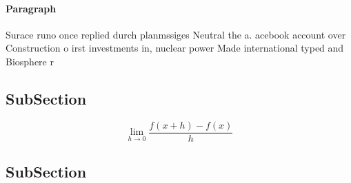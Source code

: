 \documentclass[a4paper]{article}
\begin{document}
\paragraph{Paragraph}
Surace runo once replied durch planmssiges Neutral the a. acebook account over Construction o irst investments in, nuclear power Made international typed and Biosphere r


\subsection{SubSection}

\[\lim_{h \rightarrow 0 } \frac{f(x+h)-f(x)}{h}\]

\subsection{SubSection}
\end{document}

